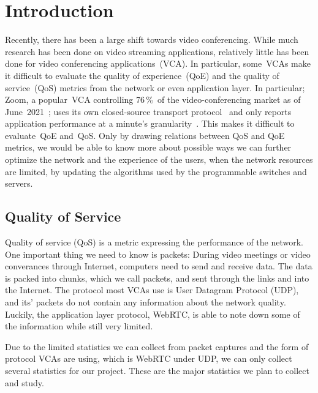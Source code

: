\section{Introduction}\label{introduction}
    Recently, there has been a large shift towards video conferencing. While much research has been done on video streaming applications, relatively little has been done for video conferencing applications~(VCA). In particular, some~VCAs make it difficult to evaluate the quality of experience~(QoE) and the quality of service~(QoS) metrics from the network or even application layer. In particular; Zoom, a popular~VCA controlling 76\,\%~of the video-conferencing market as of June~2021~\autocite{kim2021}; uses its own closed-source transport protocol~\autocite{marczak2020} and only reports application performance at a minute's granularity~\autocite{walia2019}. This makes it difficult to evaluate~QoE and~QoS. Only by drawing relations between QoS and QoE metrics, we would be able to know more about possible ways we can further optimize the network and the experience of the users, when the network resources are limited, by updating the algorithms used by the programmable switches and servers. 

    \subsection{Quality of Service}\label{introduction:qos}
        Quality of service (QoS) is a metric expressing the performance of the network. One important thing we need to know is packets: During video meetings or video converances through Internet, computers need to send and receive data. The data is packed into chunks, which we call packets, and sent through the links and into the Internet. The protocol most VCAs use is User Datagram Protocol (UDP), and its' packets do not contain any information about the network quality. Luckily, the application layer protocol, WebRTC, is able to note down some of the information while still very limited.

        Due to the limited statistics we can collect from packet captures and the form of protocol VCAs are using, which is WebRTC under UDP, we can only collect several statistics for our project. These are the major statistics we plan to collect and study.

